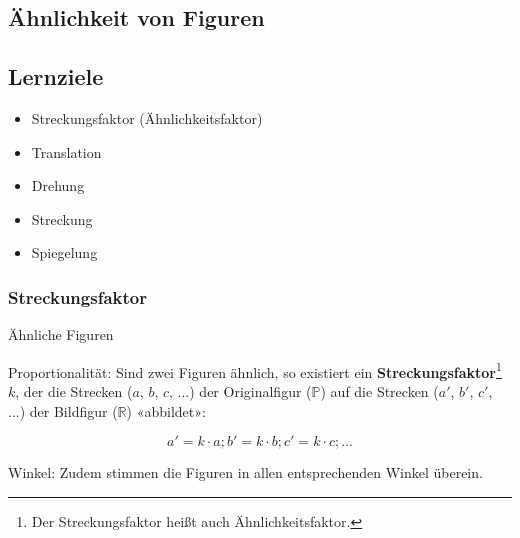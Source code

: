 
\subsection{Ähnlichkeit von Figuren}

\subsection*{Lernziele}

\begin{itemize}
\item Streckungsfaktor (Ähnlichkeitsfaktor)
\item Translation
\item Drehung
\item Streckung
\item Spiegelung
\end{itemize}

\newpage

\subsubsection{Streckungsfaktor}



\begin{definition}{Ähnliche Figuren}{}
  
Proportionalität: Sind zwei Figuren ähnlich, so existiert ein
\textbf{Streckungsfaktor}\footnote{Der
  Streckungsfaktor heißt auch Ähnlichkeitsfaktor.}
$k$, der die Strecken ($a$, $b$, $c$, ...) der Originalfigur
($\mathbb{P}$) auf die Strecken ($a'$, $b'$, $c'$, ...) der Bildfigur
($\mathbb{R}$) «abbildet»:

$$a' = k\cdot{}a; b' = k\cdot{}b; c' = k\cdot{} c; ...$$

Winkel: Zudem stimmen die Figuren in allen entsprechenden Winkel überein.
\end{definition}

